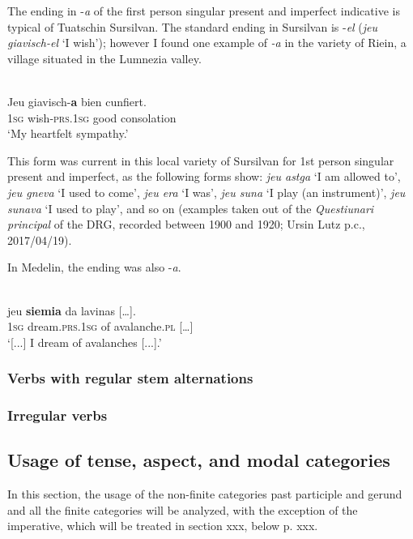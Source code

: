 The ending in -\textit{a} of the first person singular present and imperfect indicative is typical of Tuatschin Sursilvan. The standard ending in Sursilvan is -\textit{el} (\textit{jeu giavisch-el} `I wish'); however I found one example of \textit{-a} in the variety of Riein, a village situated in the Lumnezia valley.

\ea\label{}
\\
\gll  Jeu giavisch-\textbf{a} bien cunfiert.  \\
     \textsc{1sg} wish-\textsc{prs.1sg} good consolation\\
\glt `My heartfelt sympathy.'
\z

This form was current in this local variety of Sursilvan for 1st person singular present and imperfect, as the following forms show: \textit{jeu astga} `I am allowed to', \textit{jeu gneva} `I used to come', \textit{jeu era} `I was', \textit{jeu suna} `I play (an instrument)', \textit{jeu sunava} `I used to play', and so on (examples taken out of the\textit{ Questiunari principal} of the DRG, recorded between 1900 and 1920; Ursin Lutz p.c., 2017/04/19).

In Medelin, the ending was also -\textit{a}.

\ea\label{}
\\
\gll   […] jeu \textbf{siemia} da lavinas […]. \\
     […] \textsc{1sg} dream.\textsc{prs.1sg} of avalanche.\textsc{pl} […]\\
\glt `[...] I dream of avalanches [...].'
\z

\subsubsection{Verbs with regular stem alternations}

\subsubsection{Irregular verbs}

\subsection{Usage of tense, aspect, and modal categories}
In this section, the usage of the non-finite categories past participle and gerund and all the finite categories will be analyzed, with the exception of the imperative, which will be treated in section xxx, below p. xxx.

